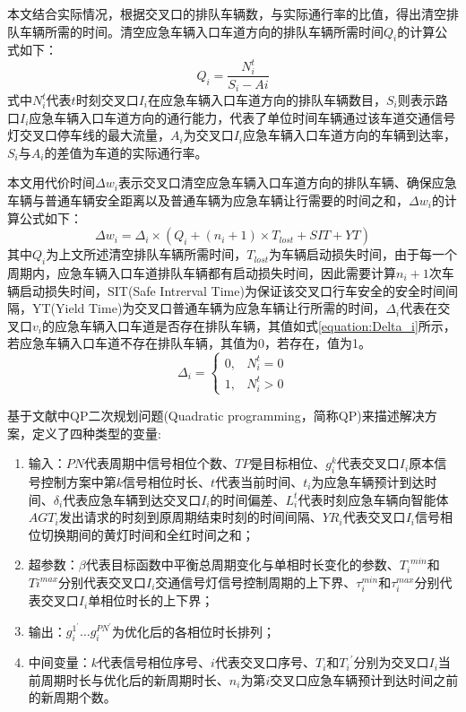 本文结合实际情况，根据交叉口的排队车辆数，与实际通行率的比值，得出清空排队车辆所需的时间。清空应急车辆入口车道方向的排队车辆所需时间${Q_i}$的计算公式如下：
\begin{equation}
	\label{equation:qi}
	Q_i=\frac{N_i^t}{S_i-Ai}
\end{equation}
式中${N_i^t}$代表${t}$时刻交叉口${I_i}$在应急车辆入口车道方向的排队车辆数目，${S_i}$则表示路口${I_i}$应急车辆入口车道方向的通行能力，代表了单位时间车辆通过该车道交通信号灯交叉口停车线的最大流量，${A_i}$为交叉口${I_i}$应急车辆入口车道方向的车辆到达率，${S_i}$与${A_i}$的差值为车道的实际通行率。

本文用代价时间${\Delta{w_i}}$表示交叉口清空应急车辆入口车道方向的排队车辆、确保应急车辆与普通车辆安全距离以及普通车辆为应急车辆让行需要的时间之和，${\Delta{w_i}}$的计算公式如下：
\begin{equation}
	\label{equation:Delta_wi}
	\Delta{w_i}=\Delta_{i}\times(Q_i+(n_i+1) \times T_{lost} + SIT + YT )
\end{equation}
其中${Q_i}$为上文所述清空排队车辆所需时间，${T_{lost}}$为车辆启动损失时间，由于每一个周期内，应急车辆入口车道排队车辆都有启动损失时间，因此需要计算${n_i+1}$次车辆启动损失时间，SIT(Safe Intrerval Time)为保证该交叉口行车安全的安全时间间隔，YT(Yield Time)为交叉口普通车辆为应急车辆让行所需的时间，${\Delta_{i}}$代表在交叉口${v_i}$的应急车辆入口车道是否存在排队车辆，其值如式\ref{equation:Delta_i}所示，若应急车辆入口车道不存在排队车辆，其值为0，若存在，值为1。
\begin{equation}
	\Delta_{i}=
	\begin{cases}
		0, & {N_i^t} = 0 \\
		1, & {N_i^t} > 0
	\end{cases}
	\label{equation:Delta_i}
\end{equation}

基于文献\cite{min}中QP二次规划问题(Quadratic programming，简称QP)来描述解决方案，定义了四种类型的变量:
\begin{enumerate}
	\item 输入：${PN}$代表周期中信号相位个数、${TP}$是目标相位、${g_i^k}$代表交叉口${I_i}$原本信号控制方案中第${k}$信号相位时长、${t}$代表当前时间、${t_i}$为应急车辆预计到达时间、${\delta_i}$代表应急车辆到达交叉口${I_i}$的时间偏差、${L_i^t}$代表时刻应急车辆向智能体${AGT_i}$发出请求的时刻到原周期结束时刻的时间间隔、${{YR}_i}$代表交叉口${I_i}$信号相位切换期间的黄灯时间和全红时间之和；
	\item 超参数：${\beta}$代表目标函数中平衡总周期变化与单相时长变化的参数、${{T_i}^{min}}$和${Ti^{max}}$分别代表交叉口${I_i}$交通信号灯信号控制周期的上下界、${\tau_i^{min}}$和${\tau_i^{max}}$分别代表交叉口${I_i}$单相位时长的上下界；
	\item 输出：${g_i^{1^\prime}\ldots{g_i^{PN^\prime}}}$为优化后的各相位时长排列；
	\item 中间变量：${k}$代表信号相位序号、${i}$代表交叉口序号、${T_i}$和${{T_i}^\prime}$分别为交叉口${I_i}$当前周期时长与优化后的新周期时长、${n_i}$为第${i}$交叉口应急车辆预计到达时间之前的新周期个数。
\end{enumerate}

